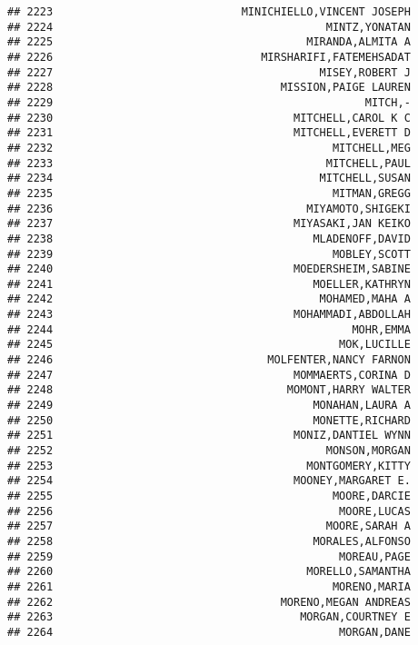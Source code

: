 \documentclass[
]{article}
\begin{document}
\begin{verbatim}
## 2223                             MINICHIELLO,VINCENT JOSEPH
## 2224                                          MINTZ,YONATAN
## 2225                                       MIRANDA,ALMITA A
## 2226                                MIRSHARIFI,FATEMEHSADAT
## 2227                                         MISEY,ROBERT J
## 2228                                   MISSION,PAIGE LAUREN
## 2229                                                MITCH,-
## 2230                                     MITCHELL,CAROL K C
## 2231                                     MITCHELL,EVERETT D
## 2232                                           MITCHELL,MEG
## 2233                                          MITCHELL,PAUL
## 2234                                         MITCHELL,SUSAN
## 2235                                           MITMAN,GREGG
## 2236                                       MIYAMOTO,SHIGEKI
## 2237                                     MIYASAKI,JAN KEIKO
## 2238                                        MLADENOFF,DAVID
## 2239                                           MOBLEY,SCOTT
## 2240                                     MOEDERSHEIM,SABINE
## 2241                                        MOELLER,KATHRYN
## 2242                                         MOHAMED,MAHA A
## 2243                                     MOHAMMADI,ABDOLLAH
## 2244                                              MOHR,EMMA
## 2245                                            MOK,LUCILLE
## 2246                                 MOLFENTER,NANCY FARNON
## 2247                                     MOMMAERTS,CORINA D
## 2248                                    MOMONT,HARRY WALTER
## 2249                                        MONAHAN,LAURA A
## 2250                                        MONETTE,RICHARD
## 2251                                     MONIZ,DANTIEL WYNN
## 2252                                          MONSON,MORGAN
## 2253                                       MONTGOMERY,KITTY
## 2254                                     MOONEY,MARGARET E.
## 2255                                           MOORE,DARCIE
## 2256                                            MOORE,LUCAS
## 2257                                          MOORE,SARAH A
## 2258                                        MORALES,ALFONSO
## 2259                                            MOREAU,PAGE
## 2260                                       MORELLO,SAMANTHA
## 2261                                           MORENO,MARIA
## 2262                                   MORENO,MEGAN ANDREAS
## 2263                                      MORGAN,COURTNEY E
## 2264                                            MORGAN,DANE

\end{verbatim}
\end{document}
